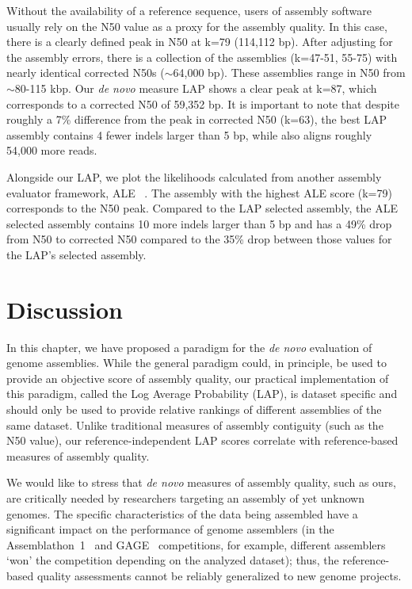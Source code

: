 \documentclass[12pt,\mydriver]{thesis}
\begin{document}
Without the availability of a
reference sequence, users of assembly software usually rely on
the N50 value as a proxy for the assembly quality.  In this case,
there is a clearly defined peak in N50 at k=79 (114,112 bp).
After adjusting for the assembly errors, there is a collection of the assemblies (k=47-51, 55-75) with nearly identical corrected N50s ($\sim$64,000 bp).
These assemblies range in N50 from $\sim$80-115 kbp.
Our \emph{de novo} measure LAP shows a clear peak at k=87, which corresponds to a corrected N50 of 59,352 bp.
It is important to note that despite roughly a 7\% difference from the peak in corrected N50 (k=63), the best LAP assembly contains 4 fewer indels larger than 5 bp, while also aligns roughly 54,000 more reads.

Alongside our LAP, we plot the likelihoods calculated from another assembly evaluator framework, ALE ~\cite{clark2013ale}.
The assembly with the highest ALE score (k=79) corresponds to the N50 peak.
Compared to the LAP selected assembly, the ALE selected assembly contains 10 more indels larger than 5 bp and has a 49\% drop from N50 to corrected N50 compared to the 35\% drop between those values for the LAP's selected assembly.


\section{Discussion}
In this chapter, we have proposed a paradigm for the \emph{de novo} evaluation
of genome assemblies.  While the general paradigm could, in principle,
be used to provide an objective score of assembly quality, our
practical implementation of this paradigm, called the Log Average
Probability (LAP), is dataset specific and should only be used to
provide relative rankings of different assemblies of the same
dataset. Unlike traditional measures of assembly
contiguity (such as the N50 value), our reference-independent LAP
scores correlate with reference-based measures of assembly
quality.

We would like to stress that \emph{de novo} measures of assembly
quality, such as ours, are critically needed by researchers targeting
an assembly of yet unknown genomes.  The specific
characteristics of the data being assembled have a significant impact
on the performance of genome assemblers (in the Assemblathon~1~\cite{earl2011assemblathon} and GAGE~\cite{salzberg2011gage}
competitions, for example, different assemblers `won' the competition
depending on the analyzed dataset); thus, the reference-based quality
assessments cannot be reliably generalized to new genome projects.
\end{document}
